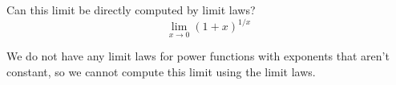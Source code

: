 \documentclass{ximera}
\begin{document}
\begin{question}
  Can this limit be directly computed by limit laws?
  \[
  \displaystyle\lim_{x\to 0}(1+x)^{1/x}
  \]
  \begin{multipleChoice}
  \end{multipleChoice}
  \begin{feedback}
  We do not have any limit laws for power functions with exponents that aren't constant, so we cannot compute this limit using the limit laws.
  \end{feedback}
\end{question}
\end{document}
